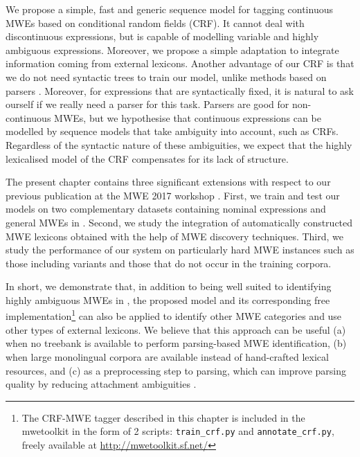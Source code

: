\documentclass[output=paper,modfonts]{langscibook}
\begin{document}
We propose a simple, fast and generic sequence model for tagging continuous MWEs based on conditional random fields (CRF). 
It cannot deal with discontinuous expressions, but is capable of modelling variable and highly ambiguous expressions. 
Moreover, we propose a simple adaptation to integrate information coming from external lexicons. 
Another advantage of our CRF is that we do not need syntactic trees to train our model, unlike methods based on parsers \citep{leroux:hal-01074298,nasr:acl:2015,constant-nivre:acl:2016}. 
Moreover, for expressions that are syntactically fixed, it is natural to ask ourself if we really need a parser for this task. 
Parsers are good for non-continuous MWEs, but we hypothesise that continuous expressions can be modelled by sequence models that take ambiguity into account, such as CRFs. 
Regardless of the syntactic nature of these ambiguities, we expect that the highly lexicalised model of the CRF compensates for its lack of structure.

The present chapter contains three significant extensions with respect to our previous publication at the MWE 2017 workshop \citep{scholivet-ramisch:2017:MWE2017}. 
First, we train and test our models on two complementary datasets containing nominal expressions and general MWEs in . 
Second, we study the integration of automatically constructed MWE lexicons obtained with the help of MWE discovery techniques.
Third, we study the performance of our system on particularly hard MWE instances such as those including variants and those that do not occur in the training corpora.

In short, we demonstrate that, in addition to being well suited to identifying highly ambiguous MWEs in  \citep{scholivet-ramisch:2017:MWE2017}, the proposed model and its corresponding free implementation\footnote{The CRF-MWE tagger described in this chapter is included in the mwetoolkit in the form of 2 scripts: \texttt{train\_crf.py} and \texttt{annotate\_crf.py}, freely available at \url{http://mwetoolkit.sf.net/} } can also be applied to identify other MWE categories and use other types of external lexicons.
We believe that this approach can be useful (a) when no treebank is available to perform parsing-based MWE identification, (b) when large monolingual corpora are available instead of hand-crafted lexical resources, and (c) as a preprocessing step to parsing, which can improve parsing quality by reducing attachment ambiguities \citep{candito-constant:acl:2014,nivre2004}.
\end{document}
